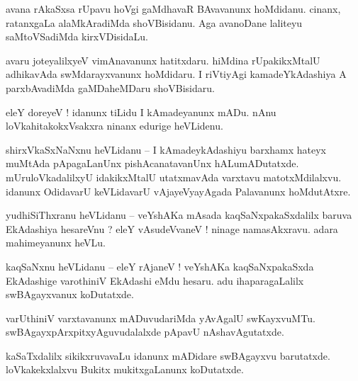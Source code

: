 \documentclass{article}
\begin{document}
\begin{mn}%
avana rAkaSxsa rUpavu hoVgi gaMdhavaR BAvavanunx hoMdidanu. cinanx, ratanxgaLa alaMkAradiMda 
shoVBisidanu. Aga avanoDane laliteyu saMtoVSadiMda kirxVDisidaLu.
\end{mn}

\begin{mn}%
avaru joteyalilxyeV vimAnavanunx hatitxdaru. hiMdina rUpakikxMtalU adhikavAda swMdarayxvanunx 
hoMdidaru. I riVtiyAgi kamadeYkAdashiya A parxbAvadiMda gaMDaheMDaru shoVBisidaru.
\end{mn}

\begin{mn}%
eleY doreyeV ! idanunx tiLidu I kAmadeyanunx mADu. nAnu loVkahitakokxVsakxra ninanx edurige heVLidenu.
\end{mn}

\begin{mn}%
shirxVkaSxNaNxnu heVLidanu -- I kAmadeykAdashiyu barxhamx hateyx muMtAda pApagaLanUnx 
pishAcanatavanUnx hALumADutatxde. mUruloVkadalilxyU idakikxMtalU utatxmavAda varxtavu 
matotxMdilalxvu. idanunx OdidavarU keVLidavarU vAjayeVyayAgada Palavanunx hoMdutAtxre.
\end{mn}


\begin{mn}%
yudhiSiThxranu heVLidanu -- veYshAKa mAsada kaqSaNxpakaSxdalilx baruva EkAdashiya hesareVnu ? eleY 
vAsudeVvaneV ! ninage namasAkxravu. adara mahimeyanunx heVLu.
\end{mn}

\begin{mn}%
kaqSaNxnu heVLidanu -- eleY rAjaneV ! veYshAKa kaqSaNxpakaSxda EkAdashige varothiniV EkAdashi eMdu 
hesaru. adu ihaparagaLalilx swBAgayxvanux koDutatxde.
\end{mn}

\begin{mn}%
varUthiniV varxtavanunx mADuvudariMda yAvAgalU swKayxvuMTu. swBAgayxpArxpitxyAguvudalalxde pApavU 
nAshavAgutatxde.
\end{mn}

\begin{mn}%
kaSaTxdalilx sikikxruvavaLu idanunx mADidare swBAgayxvu barutatxde. loVkakekxlalxvu Bukitx 
mukitxgaLanunx koDutatxde.
\end{mn}
\end{document}
